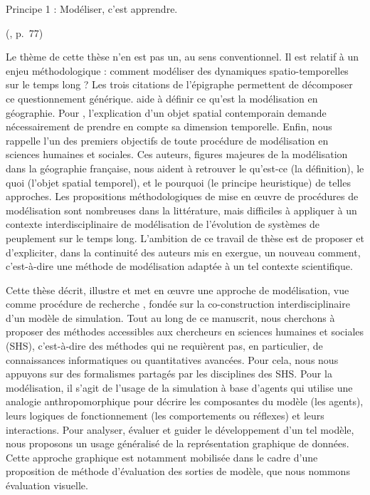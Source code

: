 \vspace*{-2.5em}\epigraph{
	\og Principe 1 : Modéliser, c'est apprendre\fg{}.
}{ (\citeyear{banos_pour_2013}, p.~77)}

Le \og thème\fg{} de cette thèse n'en est pas un, au sens conventionnel.
Il est relatif à un enjeu méthodologique : comment modéliser des dynamiques spatio-temporelles sur le temps long ?
Les trois citations de l'épigraphe permettent de décomposer ce questionnement générique.
 aide à définir ce qu'est la modélisation en géographie.
Pour , l'explication d'un objet spatial contemporain demande nécessairement de prendre en compte sa dimension temporelle.
Enfin,  nous rappelle l'un des premiers objectifs de toute procédure de modélisation en sciences humaines et sociales.
Ces auteurs, figures majeures de la modélisation dans la géographie française, nous aident à retrouver le \og qu'est-ce\fg{} (la définition), le \og quoi\fg{} (l'\og{}objet spatial\fg{} temporel), et le \og pourquoi\fg{} (le principe heuristique) de telles approches.
Les propositions méthodologiques de mise en œuvre de procédures de modélisation sont nombreuses dans la littérature, mais difficiles à appliquer à un contexte interdisciplinaire de modélisation de l'évolution de systèmes de peuplement sur le temps long.
L'ambition de ce travail de thèse est de proposer et d'expliciter, dans la continuité des auteurs mis en exergue, un nouveau \og comment\fg{}, c'est-à-dire une méthode de modélisation adaptée à un tel contexte scientifique.

Cette thèse décrit, illustre et met en œuvre une approche de modélisation, vue comme \og procédure de recherche\fg{} \autocite{brunet2000modeles}, fondée sur la co-construction interdisciplinaire d'un modèle de simulation.
Tout au long de ce manuscrit, nous cherchons à proposer des méthodes accessibles aux chercheurs en sciences humaines et sociales (SHS), c'est-à-dire des méthodes qui ne requièrent pas, en particulier, de connaissances informatiques ou quantitatives avancées.
Pour cela, nous nous appuyons sur des formalismes partagés par les disciplines des SHS.
Pour la modélisation, il s'agit de l'usage de la simulation à base d'agents qui utilise une analogie anthropomorphique pour décrire les composantes du modèle (les agents), leurs logiques de fonctionnement (les comportements ou \og réflexes\fg{}) et leurs interactions.
Pour analyser, évaluer et guider le développement d'un tel modèle, nous proposons un usage généralisé de la représentation graphique de données.
Cette approche graphique est notamment mobilisée dans le cadre d'une proposition de méthode d'évaluation des sorties de modèle, que nous nommons \og évaluation visuelle\fg{}.

